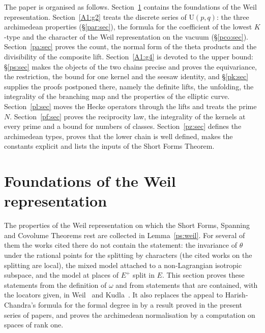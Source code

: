 \documentclass[10pt]{amsart}
\theoremstyle{definition}
\theoremstyle{remark}
\providecommand{\auS}{\mathcal S}
\providecommand{\auU}{\mathrm U}
\providecommand{\aubar}[1]{\overline{#1}}
\begin{document}
The paper is organised as follows. Section~\ref{pwf:sec} contains the foundations of the Weil
representation. Section~\ref{A1:g2} treats the discrete series of $\auU(p,q)$: the three
archimedean properties (\S\ref{par:sec}), the formula for the coefficient of the lowest $K$-type
and the character of the Weil representation on the vacuum (\S\ref{pco:sec}).
Section~\ref{pa:sec} proves the count, the normal form of the theta products and the divisibility
of the composite lift. Section~\ref{A1:g4} is devoted to the upper bound: \S\ref{ps:sec} makes
the objects of the two chains precise and proves the equivariance, the restriction, the bound for
one kernel and the seesaw identity, and \S\ref{pk:sec} supplies the proofs postponed there, namely
the definite lifts, the unfolding, the integrality of the branching map and the properties of the
elliptic curve. Section~\ref{pl:sec} moves the Hecke operators through the lifts and treats the
prime $N$. Section~\ref{pf:sec} proves the reciprocity law, the integrality of the kernels at
every prime and a bound for numbers of classes. Section~\ref{pz:sec} defines the archimedean
types, proves that the lower chain is well defined, makes the constants explicit and lists the
inputs of the Short Forms Theorem.


\providecommand{\auA}{\mathbb A}
\providecommand{\auU}{\mathrm U}
\providecommand{\auGL}{\mathrm{GL}}
\providecommand{\auHom}{\operatorname{Hom}}
\providecommand{\auS}{\mathcal S}
\providecommand{\aubar}[1]{\overline{#1}}
\providecommand{\psHS}{\mathcal H}
\providecommand{\psrho}{\varrho}
\providecommand{\psZ}{Z}
\providecommand{\pwfA}{\mathsf A}
\providecommand{\pwfL}{\mathsf L}
\providecommand{\pwfM}{\mathsf M}
\providecommand{\pwfev}{\operatorname{ev}_0}

\section{Foundations of the Weil representation}\label{pwf:sec}

The properties of the Weil representation on which the Short Forms, Spanning and
Covolume Theorems rest are collected in Lemma~\ref{ps:weil}. For several of them the works cited there do not contain the statement: the invariance of
$\theta$ under the rational points for the splitting by characters (the cited works on the
splitting are local), the mixed model attached to a non-Lagrangian isotropic subspace, and the model
at places of $E^+$ split in $E$. This section proves these statements from the definition of
$\omega$ and from statements that are contained, with the locators given, in Weil~\cite{WeilActa}
and Kudla~\cite{KudlaSplitting}. It also replaces the appeal to Harish-Chandra's formula for the
formal degree in {\cite[Proposition~5.2]{P51}} by a result proved in the present series of papers, and proves the
archimedean normalisation {\cite[(30)]{P54}} by a computation on spaces of rank one.
\end{document}
